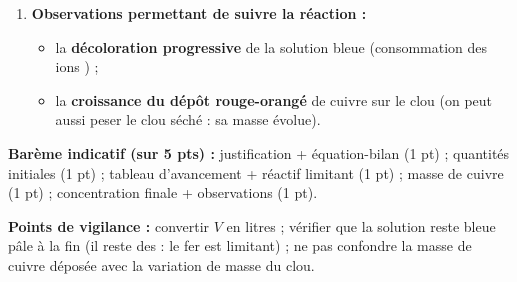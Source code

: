 \documentclass[11pt]{article}
\begin{document}
\begin{corrige}
\begin{enumerate}
    \[ [\ce{Fe^2+}]_f = \frac{0,10}{0,250} = \boxed{\SI{0,40}{mol.L^{-1}}} \]
    \item \textbf{Observations permettant de suivre la réaction :}
    \begin{itemize}
        \item la \textbf{décoloration progressive} de la solution bleue (consommation des ions ) ;
        \item la \textbf{croissance du dépôt rouge-orangé} de cuivre sur le clou (on peut aussi peser le clou séché : sa masse évolue).
    \end{itemize}
\end{enumerate}
\textbf{Barème indicatif (sur 5 pts) :} justification + équation-bilan (1 pt) ; quantités initiales (1 pt) ; tableau d'avancement + réactif limitant (1 pt) ; masse de cuivre (1 pt) ; concentration finale + observations (1 pt).

\textbf{Points de vigilance :} convertir $V$ en litres ; vérifier que la solution reste bleue pâle à la fin (il reste des  : le fer est limitant) ; ne pas confondre la masse de cuivre déposée avec la variation de masse du clou.
\end{corrige}
\end{document}
